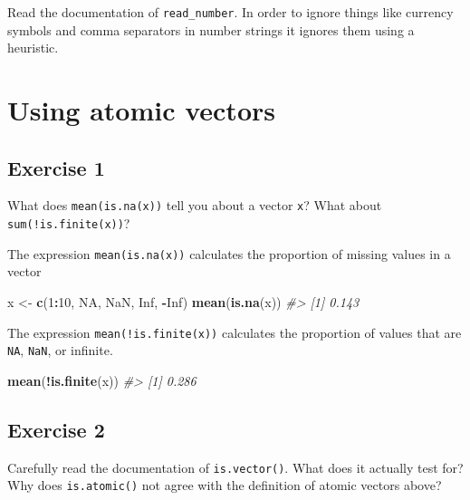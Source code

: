 \documentclass[]{book}
\newenvironment{Shaded}{\begin{snugshade}}{\end{snugshade}}
\newcommand{\CommentTok}[1]{\textcolor[rgb]{0.56,0.35,0.01}{\textit{#1}}}
\newcommand{\DecValTok}[1]{\textcolor[rgb]{0.00,0.00,0.81}{#1}}
\newcommand{\KeywordTok}[1]{\textcolor[rgb]{0.13,0.29,0.53}{\textbf{#1}}}
\newcommand{\NormalTok}[1]{#1}
\newcommand{\OperatorTok}[1]{\textcolor[rgb]{0.81,0.36,0.00}{\textbf{#1}}}
\newcommand{\OtherTok}[1]{\textcolor[rgb]{0.56,0.35,0.01}{#1}}
\newcommand{\StringTok}[1]{\textcolor[rgb]{0.31,0.60,0.02}{#1}}
\theoremstyle{plain}
\theoremstyle{remark}
\theoremstyle{definition}
\theoremstyle{definition}
\theoremstyle{definition}
\theoremstyle{remark}
\begin{document}
Read the documentation of \texttt{read\_number}. In order to ignore
things like currency symbols and comma separators in number strings it
ignores them using a heuristic.

\hypertarget{using-atomic-vectors}{%
\section{Using atomic vectors}\label{using-atomic-vectors}}

\hypertarget{exercise-1-54}{%
\subsection{Exercise 1}\label{exercise-1-54}}

What does \texttt{mean(is.na(x))} tell you about a vector \texttt{x}?
What about \texttt{sum(!is.finite(x))}?

The expression \texttt{mean(is.na(x))} calculates the proportion of
missing values in a vector

\begin{Shaded}
\begin{Highlighting}[]
\NormalTok{x <-}\StringTok{ }\KeywordTok{c}\NormalTok{(}\DecValTok{1}\OperatorTok{:}\DecValTok{10}\NormalTok{, }\OtherTok{NA}\NormalTok{, }\OtherTok{NaN}\NormalTok{, }\OtherTok{Inf}\NormalTok{, }\OperatorTok{-}\OtherTok{Inf}\NormalTok{)}
\KeywordTok{mean}\NormalTok{(}\KeywordTok{is.na}\NormalTok{(x))}
\CommentTok{#> [1] 0.143}
\end{Highlighting}
\end{Shaded}

The expression \texttt{mean(!is.finite(x))} calculates the proportion of
values that are \texttt{NA}, \texttt{NaN}, or infinite.

\begin{Shaded}
\begin{Highlighting}[]
\KeywordTok{mean}\NormalTok{(}\OperatorTok{!}\KeywordTok{is.finite}\NormalTok{(x))}
\CommentTok{#> [1] 0.286}
\end{Highlighting}
\end{Shaded}

\hypertarget{exercise-2-52}{%
\subsection{Exercise 2}\label{exercise-2-52}}

Carefully read the documentation of \texttt{is.vector()}. What does it
actually test for? Why does \texttt{is.atomic()} not agree with the
definition of atomic vectors above?
\end{document}

